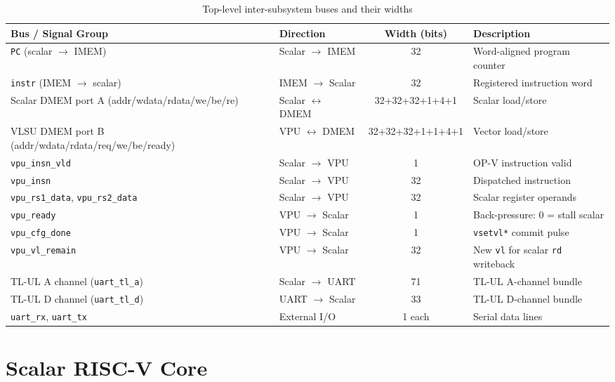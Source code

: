 \begin{table}[H]
\centering
\caption{Top-level inter-subsystem buses and their widths}
\label{tab:top_buses}
\begin{tabular}{llcl}
\toprule
\textbf{Bus / Signal Group} & \textbf{Direction} & \textbf{Width (bits)} & \textbf{Description} \\
\midrule
\texttt{PC} (scalar $\to$ IMEM)               & Scalar $\to$ IMEM   & 32  & Word-aligned program counter \\
\texttt{instr} (IMEM $\to$ scalar)            & IMEM $\to$ Scalar   & 32  & Registered instruction word \\
Scalar DMEM port A (addr/wdata/rdata/we/be/re) & Scalar $\leftrightarrow$ DMEM & 32+32+32+1+4+1 & Scalar load/store \\
VLSU DMEM port B (addr/wdata/rdata/req/we/be/ready) & VPU $\leftrightarrow$ DMEM & 32+32+32+1+1+4+1 & Vector load/store \\
\texttt{vpu\_insn\_vld}                        & Scalar $\to$ VPU    & 1   & OP-V instruction valid \\
\texttt{vpu\_insn}                             & Scalar $\to$ VPU    & 32  & Dispatched instruction \\
\texttt{vpu\_rs1\_data}, \texttt{vpu\_rs2\_data} & Scalar $\to$ VPU  & 32  & Scalar register operands \\
\texttt{vpu\_ready}                            & VPU $\to$ Scalar    & 1   & Back-pressure: 0 = stall scalar \\
\texttt{vpu\_cfg\_done}                        & VPU $\to$ Scalar    & 1   & \texttt{vsetvl*} commit pulse \\
\texttt{vpu\_vl\_remain}                       & VPU $\to$ Scalar    & 32  & New \texttt{vl} for scalar \texttt{rd} writeback \\
TL-UL A channel (\texttt{uart\_tl\_a})         & Scalar $\to$ UART   & 71  & TL-UL A-channel bundle \\
TL-UL D channel (\texttt{uart\_tl\_d})         & UART $\to$ Scalar   & 33  & TL-UL D-channel bundle \\
\texttt{uart\_rx}, \texttt{uart\_tx}            & External I/O        & 1 each & Serial data lines \\
\bottomrule
\end{tabular}
\end{table}

\section{Scalar RISC-V Core}
\label{sec:scalar_core}

